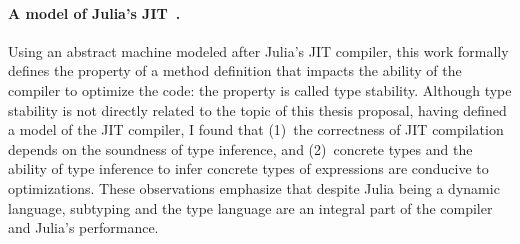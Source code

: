 \paragraph{A model of Julia's JIT~\cite{TODO}.}
Using an abstract machine modeled after Julia's JIT compiler, this work formally
defines the property of a method definition that impacts the ability of
the compiler to optimize the code: the property is called type stability.
Although type stability is not directly related to the topic of this thesis
proposal, having defined a model of the JIT compiler, I found that
(1)~the correctness of JIT compilation depends on the soundness of type
inference, and (2)~concrete types and the ability of type inference to infer
concrete types of expressions are conducive to optimizations.
These observations emphasize that despite Julia being a dynamic language,
subtyping and the type language are an integral part of the compiler
and Julia's performance.

